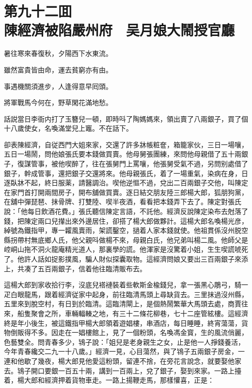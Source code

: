 
\chapter*{第九十二囬　\\陳經濟被陷嚴州府　吴月娘大鬧授官廳}


\begin{myquote}
暑往寒來春復秋，夕陽西下水東流。

雖然富貴皆由命，運去貧窮亦有由。

事遇機關須進步，人逢得意早囘頭。

將軍戰馬今何在，野草閑花滿地愁。
\end{myquote}

話説當日李衙内打了玉簪兒一頓，即時呌了陶媽媽來，領出賣了八兩銀子，買了個十八歲使女，名喚滿堂兒上竈。不在話下。

卻表陳經濟，自従西門大姐來家，交還了許多牀帳粧奩，箱籠家伙，三日一場嚷，五日一場鬧，問他娘張氏要本錢做買賣。他母舅張團練，來問他母親借了五十兩銀子，復謀管事，被他喫醉了，往在張舅門上罵嚷，他張舅受氣不過，另問别處借了銀子，幹成管事，還把銀子交還將來。他母親張氏，着了一場重氣，染病在身，日逐臥牀不起，終日服薬，請醫調治。喫他逆慪不過，兌出二百兩銀子交他，叫陳定在家門首打開兩間房子，開布舖做買賣。逐日結交朋友陸三郎楊大郎，狐朋狗黨，在舖中彈琵琶、抹骨牌、打雙陸、喫半夜酒，看看把本錢弄下去了。陳定對張氏說：「他每日飲酒花費。」張氏聽信陳定言語，不託他。經濟反說陳定染布去尅落了錢，把陳定兩口兒攆出來外邊居住，卻搭了楊大郎做夥計。這楊大郎名喚楊光彦，綽號為鐵指甲，專一糶風賣雨，架謊鑿空，撾着人家本錢就使。他祖貫係沒州脱空縣拐帶村無底鄉人氏，他父親呌做楊不來，母親白氏，他兄弟叫楊二風。他師父是崆峒山拖不洞火龍庵精光道人，那裏學的謊。他渾家是沒驚着小姐，生生喫謊唬死了。他許人話如捉影撲風，騙人財似探囊取物。這經濟問娘又要出三百兩銀子來添上，共凑了五百兩銀子，信着他往臨清販布去。

這楊大郎到家收拾行李，沒底兒褡褳裝着些軟斯金楡錢兒，拿一張黑心鵰弓，騎一疋白眼龍馬，跟着經濟従家中起身，前往臨清馬頭上尋缺貨去。三里抹過沒州縣，五里來到脫空村，有日到於臨清。這臨清閘上，是個熱鬧繁華大馬頭去處，商賈往來，船隻聚會之所，車輛輻輳之地，有三十二條花柳巷，七十二座管絃樓。這經濟終是年小後生，被這鐵指甲楊大郎領着遊娼樓，串酒店，每日睡睡，終宵蕩蕩，貨物倒販得不多。因走在一娼樓館上，見了一個粉頭，名喚馮金寳，生的風流俏麗，色藝雙全。問青春多少，鴇子說：「姐兒是老身親生之女，止是他一人掙錢養活，今年青春纔交二九一十八歲。」經濟一見，心目蕩然，與了鴇子五兩銀子房金，一連和他歇了幾夜，楊大郎見他愛這粉頭，留連不捨，在旁花言說念，就要娶他家去。鴇子開口要銀一百五十兩，講到一百兩上，兌了銀子，娶到來家。一路上擡着，楊大郎和經濟押着貨物車走。一路上揚鞭走馬，那樣懽喜，正是：

